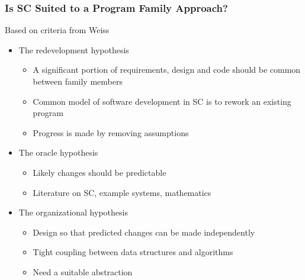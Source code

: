 \documentclass[t,12pt,numbers,fleqn]{beamer}
\begin{document}
\begin{frame}

\frametitle{Is SC Suited to a Program Family Approach?}

Based on criteria from Weiss \cite{ArdisAndWeiss1997, Weiss1997, Weiss1998,
  CukaAndWeiss1997,WeissAndLai1999}
\begin{itemize}
\item The redevelopment hypothesis
\begin{itemize}
\item A significant portion of requirements, design and code should be common between family members
\item Common model of software development in SC is to rework an existing program
\item Progress is made by removing assumptions
\end{itemize}

\item The oracle hypothesis
\begin{itemize}
\item Likely changes should be predictable
\item Literature on SC, example systems, mathematics
\end{itemize}

\item The organizational hypothesis
\begin{itemize}
\item Design so that predicted changes can be made independently
\item Tight coupling between data structures and algorithms
\item Need a suitable abstraction
\end{itemize}

\end{itemize}

\end{frame}

\end{document}
